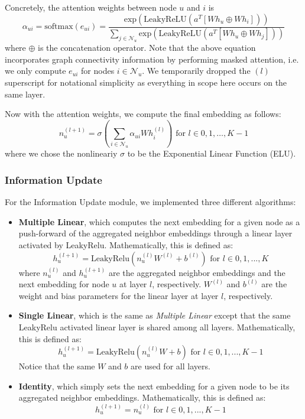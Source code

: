 \documentclass{article}
\begin{document}
\begin{itemize}
    Concretely, the attention weights between node $u$ and $i$ is $$\alpha_{ui} = \text{softmax} (e_{ui}) = \frac{\text{exp}(\text{LeakyReLU} (a^T [Wh_u \oplus Wh_i]) )}{\sum_{j\in \mathcal{N}_u}  \text{exp}(\text{LeakyReLU} (a^T [Wh_u \oplus Wh_j]) )}$$
    where $\oplus$ is the concatenation operator. Note that the above equation incorporates graph connectivity information by performing masked attention, i.e. we only compute $e_{ui}$ for nodes $i\in \mathcal{N}_u$. We temporarily dropped the ${(l)}$ superscript for notational simplicity as everything in scope here occurs on the same layer.

    Now with the attention weights, we compute the final embedding as follows: $$n_u^{(l + 1)} = \sigma ( \sum_{i\in \mathcal{N}_u} \alpha_{ui} W h_i^{(l)}  ) \text{ for } l \in 0, 1, \hdots, K - 1 $$ where we chose the nonlineariy $\sigma$ to be the Exponential Linear Function (ELU).
\end{itemize}

\subsubsection{Information Update}

For the Information Update module, we implemented three different algorithms:
\begin{itemize}
    \item \textbf{Multiple Linear}, which computes the next embedding for a given node as a push-forward of the aggregated neighbor embeddings through a linear layer activated by LeakyRelu. Mathematically, this is defined as:
    $$
    h_u^{(l+1)} = \mbox{LeakyRelu}(n_u^{(l)} W^{(l)} + b^{(l)}) \text{ for } l \in 0, 1, ..., K
    $$
    where $n_u^{(l)}$ and $h_u^{(l+1)}$ are the aggregated neighbor embeddings and the next embedding for node $u$ at layer $l$, respectively. $W^{(l)}$ and $b^{(l)}$ are the weight and bias parameters for the linear layer at layer $l$, respectively.
    \item \textbf{Single Linear}, which is the same as \textit{Multiple Linear} except that the same LeakyRelu activated linear layer is shared among all layers. Mathematically, this is defined as:
    $$
    h_u^{(l+1)} = \mbox{LeakyRelu}(n_u^{(l)} W + b) \text{ for } l \in 0, 1, ..., K - 1
    $$
    Notice that the same $W$ and $b$ are used for all layers.
    \item \textbf{Identity}, which simply sets the next embedding for a given node to be its aggregated neighbor embeddings. Mathematically, this is defined as:
    $$
    h_u^{(l+1)} = n_u^{(l)} \text{ for } l \in 0, 1, ..., K - 1
    $$
\end{itemize}
\end{document}
